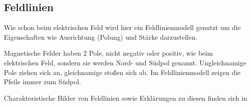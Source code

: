 




%
%	






\subsection{Feldlinien}

Wie schon beim elektrischen Feld wird hier ein Feldlinienmodell genutzt um die Eigenschaften wie Ausrichtung (Polung) und Stärke darzustellen. 

Magnetische Felder haben 2 Pole, nicht negativ oder positiv, wie beim elektrischen Feld, sondern sie werden Nord- und Südpol genannt. Ungleichnamige Pole ziehen sich an, gleichnamige stoßen sich ab. Im Feldlinienmodell zeigen die Pfeile immer zum Südpol.

Charakteristische Bilder von Feldlinien sowie Erklärungen zu diesen finden sich in 


